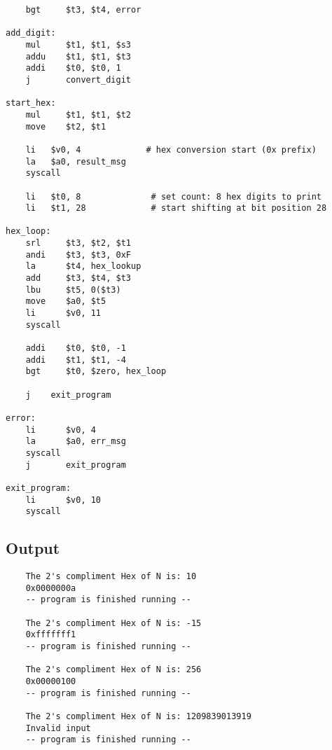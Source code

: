 \documentclass[a4paper]{article}
\begin{document}
\begin{verbatim}
    bgt     $t3, $t4, error

add_digit:
    mul     $t1, $t1, $s3
    addu    $t1, $t1, $t3
    addi    $t0, $t0, 1
    j       convert_digit

start_hex:
    mul     $t1, $t1, $t2
    move    $t2, $t1

    li   $v0, 4             # hex conversion start (0x prefix)
    la   $a0, result_msg
    syscall

    li   $t0, 8              # set count: 8 hex digits to print
    li   $t1, 28             # start shifting at bit position 28

hex_loop:
    srl     $t3, $t2, $t1
    andi    $t3, $t3, 0xF
    la      $t4, hex_lookup
    add     $t3, $t4, $t3
    lbu     $t5, 0($t3)
    move    $a0, $t5
    li      $v0, 11
    syscall

    addi    $t0, $t0, -1
    addi    $t1, $t1, -4
    bgt     $t0, $zero, hex_loop

    j    exit_program

error:
    li      $v0, 4
    la      $a0, err_msg
    syscall
    j       exit_program

exit_program:
    li      $v0, 10
    syscall
\end{verbatim}

\subsection*{Output}
\begin{verbatim}
    The 2's compliment Hex of N is: 10
    0x0000000a
    -- program is finished running --
    
    The 2's compliment Hex of N is: -15
    0xfffffff1
    -- program is finished running --
    
    The 2's compliment Hex of N is: 256
    0x00000100
    -- program is finished running --
        
    The 2's compliment Hex of N is: 1209839013919
    Invalid input
    -- program is finished running --
\end{verbatim}
\end{document}
